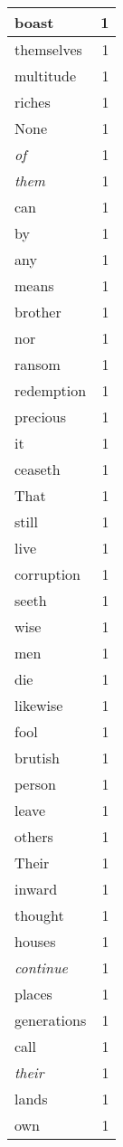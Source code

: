 \begin{center}
\begin{longtable}{l|r}
boast & 1 \\ \hline
themselves & 1 \\ \hline
multitude & 1 \\ \hline
riches & 1 \\ \hline
None & 1 \\ \hline
\emph{of} & 1 \\ \hline
\emph{them} & 1 \\ \hline
can & 1 \\ \hline
by & 1 \\ \hline
any & 1 \\ \hline
means & 1 \\ \hline
brother & 1 \\ \hline
nor & 1 \\ \hline
ransom & 1 \\ \hline
redemption & 1 \\ \hline
precious & 1 \\ \hline
it & 1 \\ \hline
ceaseth & 1 \\ \hline
That & 1 \\ \hline
still & 1 \\ \hline
live & 1 \\ \hline
corruption & 1 \\ \hline
seeth & 1 \\ \hline
wise & 1 \\ \hline
men & 1 \\ \hline
die & 1 \\ \hline
likewise & 1 \\ \hline
fool & 1 \\ \hline
brutish & 1 \\ \hline
person & 1 \\ \hline
leave & 1 \\ \hline
others & 1 \\ \hline
Their & 1 \\ \hline
inward & 1 \\ \hline
thought & 1 \\ \hline
houses & 1 \\ \hline
\emph{continue} & 1 \\ \hline
places & 1 \\ \hline
generations & 1 \\ \hline
call & 1 \\ \hline
\emph{their} & 1 \\ \hline
lands & 1 \\ \hline
own & 1 \\ \hline

\end{longtable}
\end{center}
